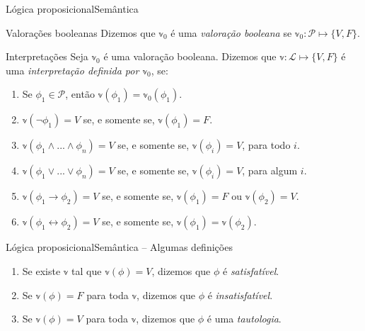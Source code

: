 \begin{frame}{Lógica proposicional}{Semântica}
	\vspace{-.3cm}
	\begin{footnotesize}
	\begin{block}{Valorações booleanas}
		Dizemos que $\mathbb{v}_0$ é uma \emph{valoração booleana} se $\mathbb{v}_0 : \mathcal{P} \longmapsto \{V,F \}$.
	\end{block}
	\pause
	\vspace{-.2cm}
	\begin{block}{Interpretações}
		Seja $\mathbb{v}_0$ é uma valoração booleana. Dizemos que $\mathbb{v} : \mathcal{L} \longmapsto \{V,F \}$ é uma \emph{interpretação definida por $\mathbb{v}_0$}, se:
		\begin{enumerate}
			\pause\item Se $\phi_1 \in \mathcal{P}$, então $\mathbb{v}(\phi_1) = \mathbb{v}_0(\phi_1)$.
			\pause\item $\mathbb{v}(\neg \phi_1) = V$ se, e somente se, $\mathbb{v}(\phi_1) = F$.
			\pause\item $\mathbb{v}(\phi_1 \wedge ... \wedge \phi_n) = V$ se, e somente se, $\mathbb{v}(\phi_i) = V$, para todo $i$.
			\pause\item $\mathbb{v}(\phi_1 \vee ... \vee \phi_n) = V$ se, e somente se, $\mathbb{v}(\phi_i) = V$, para algum $i$.
			\pause\item $\mathbb{v}(\phi_1 \rightarrow \phi_2) = V$ se, e somente se, $\mathbb{v}(\phi_1) = F$ ou $\mathbb{v}(\phi_2) = V$.
			\pause\item $\mathbb{v}(\phi_1 \leftrightarrow \phi_2) = V$ se, e somente se, $\mathbb{v}(\phi_1) = \mathbb{v}(\phi_2)$.
		\end{enumerate}
	\end{block}
	\end{footnotesize}
\end{frame}

\begin{frame}{Lógica proposicional}{Semântica -- Algumas definições}
	\begin{enumerate}
		\item Se existe $\mathbb{v}$ tal que $\mathbb{v}(\phi) = V$, dizemos que $\phi$ é \emph{satisfatível}.
		\pause\item Se $\mathbb{v}(\phi) = F$ para toda $\mathbb{v}$, dizemos que $\phi$ é \emph{insatisfatível}.
		\pause\item Se $\mathbb{v}(\phi) = V$ para toda $\mathbb{v}$, dizemos que $\phi$ é uma \emph{tautologia}.
	\end{enumerate}
\end{frame}

